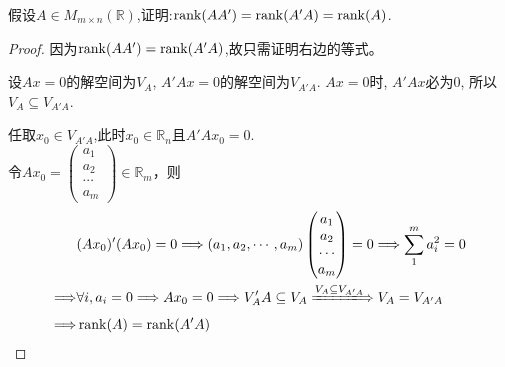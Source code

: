\begin{example}
  假设\(A\in M_{m\times n}(\mathbb{R})\),证明:\(\operatorname{rank}(AA')=\operatorname{rank}(A'A)=\operatorname{rank}(A)\).
\end{example}

\begin{proof}
  因为\(\operatorname{rank}(AA')=\operatorname{rank}(A'A)\),故只需证明右边的等式。

  设\(Ax=0\)的解空间为\(V_A\), \(A'Ax=0\)的解空间为\(V_{A'A}\). \(Ax=0\)时, \(A'Ax\)必为\(0\),
  所以\(V_A\subseteq V_{A'A}\).

  任取\(x_0\in V_{A'A}\),此时\(x_0\in\mathbb{R}_n\)且\(A'Ax_0=0\).\\
  令\(Ax_0=\begin{pmatrix}a_1\\a_2\\\cdots\\a_m\end{pmatrix}
  \in\mathbb{R}_m\)，则
  \begin{align*}
     & (Ax_0)'(Ax_0)=0 \Longrightarrow
                (a_1,a_2,\cdots,a_m)\begin{pmatrix}a_1\\
                    a_2\\
                    \cdots\\
                    a_m\end{pmatrix}=0
                \Longrightarrow \sum_1^ma_i^2=0\\
    \Longrightarrow & \forall i, a_i=0
                \Longrightarrow Ax_0=0
                \Longrightarrow V_A'A\subseteq V_A
                \xLongrightarrow{V_A\subseteq V_{A'A}}V_A=V_{A'A}\\
    \Longrightarrow & \rank(A)=\rank(A'A)
\end{align*}
\end{proof}
